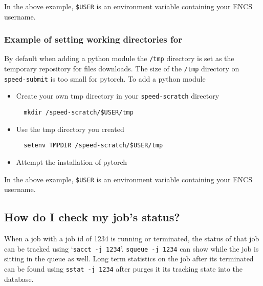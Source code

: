 In the above example, \verb!$USER! is an environment variable containing your ENCS username.

\subsubsection{Example of setting working directories for }

By default when adding a python module the \texttt{/tmp} directory is set as the temporary repository for files downloads. 
The size of the \texttt{/tmp} directory on \verb!speed-submit! is too small for pytorch.
To add a python module
\begin{itemize}
    \item 	
	Create your own tmp directory in your \verb!speed-scratch! directory
	\begin{verbatim} 
  mkdir /speed-scratch/$USER/tmp
	\end{verbatim}
	\item
  Use the tmp directory you created
	\begin{verbatim} 
  setenv TMPDIR /speed-scratch/$USER/tmp
	\end{verbatim}
    \item
	Attempt the installation of pytorch
\end{itemize}

In the above example, \verb!$USER! is an environment variable containing your ENCS username.

\subsection{How do I check my job's status?}

When a job with a job id of 1234 is running or terminated, the status of that job can be tracked using `\verb!sacct -j 1234!'.
\texttt{squeue -j 1234} can show while the job is sitting in the queue as well.
Long term statistics on the job after its terminated can be found using
\texttt{sstat -j 1234} after  purges it its tracking state
into the database.

